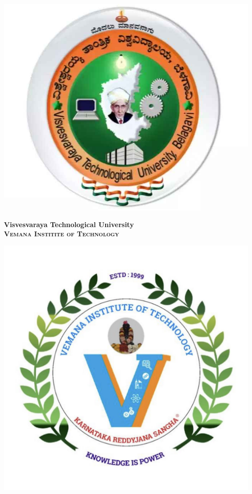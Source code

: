 \documentclass[a4paper,12pt]{article}
\begin{document}
\begin{minipage}{0.2\textwidth}
    \includegraphics[width=\textwidth]{vtulogo.jpg} %
\end{minipage}
\begin{minipage}{0.5\textwidth}
    \centering
    \textbf{\Large Visvesvaraya Technological University} \\
    \vspace{0.2cm}
   \textbf{\textsc{\large Vemana Institite of Technology}}
    \vspace{0.2cm}
\end{minipage}
\begin{minipage}{0.2\textwidth}
    \includegraphics[width=\textwidth]{vitlogo.jpg} %
\end{minipage}
\end{document}
